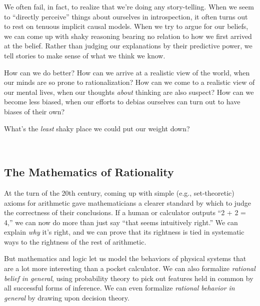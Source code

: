 {
 We often fail, in fact, to realize that we're
doing any story-telling. When we seem to ``directly
perceive'' things about ourselves in introspection,
it often turns out to rest on tenuous implicit causal
models. When we try to argue for our beliefs, we
can come up with shaky reasoning bearing no relation to how we first
arrived at the belief. Rather than judging our
explanations by their predictive power, we tell stories to make sense
of what we think we know.}

{
 How can we do better? How can we arrive at a realistic view of the
world, when our minds are so prone to rationalization? How can we come
to a realistic view of our mental lives, when our thoughts
\textit{about} thinking are also suspect? How can we become less
biased, when our efforts to debias ourselves can turn out to have
biases of their own?}

{
 What's the \textit{least} shaky place we could put
our weight down?}

{
 ~}

\subsection{The Mathematics of Rationality}

{
 At the turn of the 20th century, coming up with simple (e.g.,
set-theoretic) axioms for arithmetic gave mathematicians a clearer
standard by which to judge the correctness of their conclusions. If a
human or calculator outputs ``2 + 2 =
4,'' we can now do more than just say
``that seems intuitively right.'' We
can explain \textit{why} it's right, and we can prove
that its rightness is tied in systematic ways to the rightness of the
rest of arithmetic.}

{
 But mathematics and logic let us model the behaviors of physical
systems that are a lot more interesting than a pocket calculator. We
can also formalize \textit{rational belief in general}, using
probability theory to pick out features held in common by all
successful forms of inference. We can even formalize \textit{rational
behavior in general} by drawing upon decision theory.}

